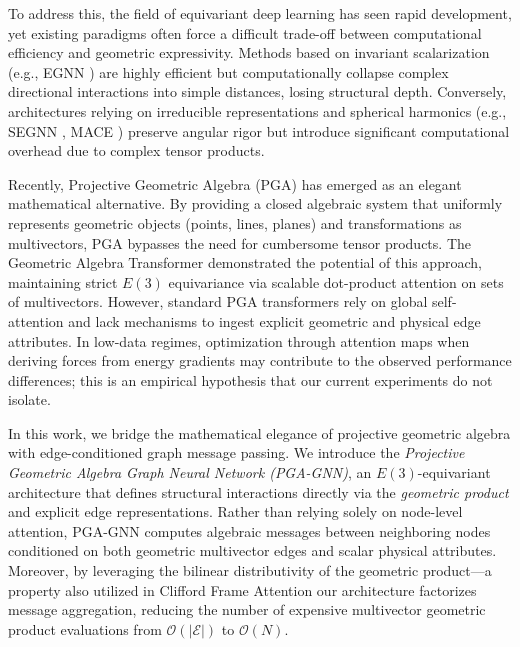 \documentclass[10pt]{article}
\begin{document}
To address this, the field of equivariant deep learning has seen rapid development, yet existing paradigms often force a difficult trade-off between computational efficiency and geometric expressivity. Methods based on invariant scalarization (e.g., EGNN \citep{egnn}) are highly efficient but computationally collapse complex directional interactions into simple distances, losing structural depth. Conversely, architectures relying on irreducible representations and spherical harmonics (e.g., SEGNN \citep{segnn}, MACE \citep{mace}) preserve angular rigor but introduce significant computational overhead due to complex tensor products.

Recently, Projective Geometric Algebra (PGA) has emerged as an elegant mathematical alternative. By providing a closed algebraic system that uniformly represents geometric objects (points, lines, planes) and transformations as multivectors, PGA bypasses the need for cumbersome tensor products. The Geometric Algebra Transformer \citep[GATr;][]{gatr} demonstrated the potential of this approach, maintaining strict $E(3)$ equivariance via scalable dot-product attention on sets of multivectors. However, standard PGA transformers rely on global self-attention and lack mechanisms to ingest explicit geometric and physical edge attributes. In low-data regimes, optimization through attention maps when deriving forces from energy gradients may contribute to the observed performance differences; this is an empirical hypothesis that our current experiments do not isolate.

In this work, we bridge the mathematical elegance of projective geometric algebra with edge-conditioned graph message passing. We introduce the \emph{Projective Geometric Algebra Graph Neural Network (PGA-GNN)}, an $E(3)$-equivariant architecture that defines structural interactions directly via the \textit{geometric product} and explicit edge representations. Rather than relying solely on node-level attention, PGA-GNN computes algebraic messages between neighboring nodes conditioned on both geometric multivector edges and scalar physical attributes. Moreover, by leveraging the bilinear distributivity of the geometric product—a property also utilized in Clifford Frame Attention \citep{gafl} our architecture factorizes message aggregation, reducing the number of expensive multivector geometric product evaluations from $\mathcal{O}(|\mathcal{E}|)$ to $\mathcal{O}(N)$.
\end{document}
